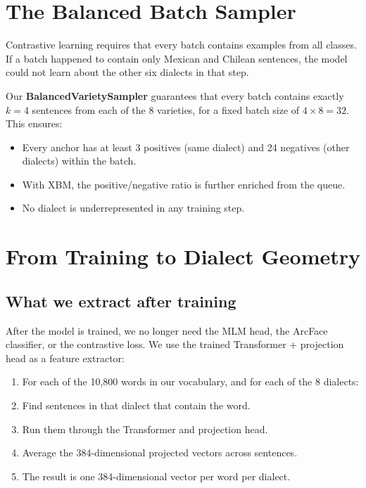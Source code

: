 \documentclass[11pt,a4paper]{article}
\theoremstyle{definition}
\begin{document}
\section{The Balanced Batch Sampler}
\label{sec:sampler}

Contrastive learning requires that every batch contains examples from
all classes. If a batch happened to contain only Mexican and Chilean
sentences, the model could not learn about the other six dialects in
that step.

Our \textbf{BalancedVarietySampler} guarantees that every batch
contains exactly $k = 4$ sentences from each of the 8 varieties, for
a fixed batch size of $4 \times 8 = 32$. This ensures:
\begin{itemize}[nosep]
  \item Every anchor has at least 3 positives (same dialect) and 24
        negatives (other dialects) within the batch.
  \item With XBM, the positive/negative ratio is further enriched from
        the queue.
  \item No dialect is underrepresented in any training step.
\end{itemize}

\section{From Training to Dialect Geometry}
\label{sec:geometry}

\subsection{What we extract after training}

After the model is trained, we no longer need the MLM head, the
ArcFace classifier, or the contrastive loss. We use the trained
Transformer + projection head as a feature extractor:

\begin{enumerate}[nosep]
  \item For each of the 10,800 words in our vocabulary, and for each
        of the 8 dialects:
  \item Find sentences in that dialect that contain the word.
  \item Run them through the Transformer and projection head.
  \item Average the 384-dimensional projected vectors across sentences.
  \item The result is one 384-dimensional vector per word per dialect.
\end{enumerate}
\end{document}
